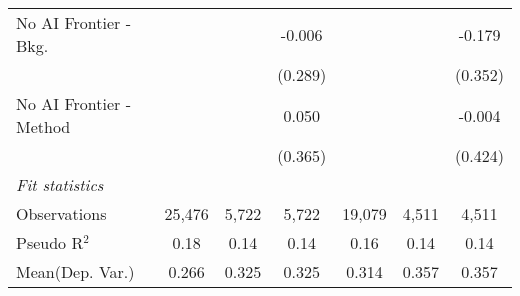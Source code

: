 \begin{tabular}{lcccccc}
   No AI Frontier - Bkg.   &              &         & -0.006  &               &         & -0.179\\   
                           &              &         & (0.289) &               &         & (0.352)\\   
   No AI Frontier - Method &              &         & 0.050   &               &         & -0.004\\   
                           &              &         & (0.365) &               &         & (0.424)\\   
   \midrule
   \emph{Fit statistics}\\
   Observations            & 25,476       & 5,722   & 5,722   & 19,079        & 4,511   & 4,511\\  
   Pseudo R$^2$            & 0.18         & 0.14    & 0.14    & 0.16          & 0.14    & 0.14\\  
Mean(Dep. Var.) & 0.266 & 0.325 & 0.325 & 0.314 & 0.357 & 0.357 \\
   

\end{tabular}
